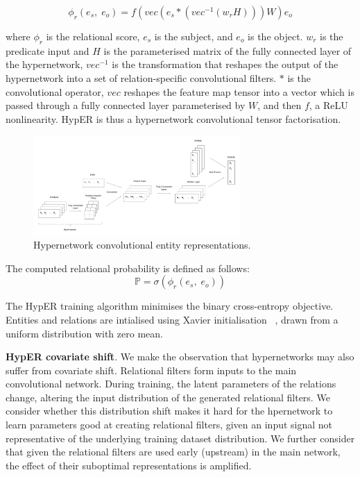 \begin{equation}
	\phi_r(e_s, \; e_o) = f(vec(e_s * (vec^{-1}(w_rH)))W)e_o
\end{equation}

\noindent where $ \phi_r $ is the relational score, $ e_s $ is the subject, and $ e_o $ is the object. $ w_r $ is the predicate input and $ H $ is the parameterised matrix of the fully connected layer of the hypernetwork, $ vec^{-1} $ is the transformation that reshapes the output of the hypernetwork into a set of relation-specific convolutional filters. $ * $ is the convolutional operator, $ vec $ reshapes the feature map tensor into a vector which is passed through a fully connected layer parameterised by $ W $, and then $ f $, a ReLU nonlinearity. HypER is thus a hypernetwork convolutional tensor factorisation. 

\begin{figure}[H]
   	\centering
    	\includegraphics[width=0.7\textwidth, height=0.5\textwidth]{hyper_neural_tensor_network_final}
	\caption{Hypernetwork convolutional entity representations.}
\end{figure}

\noindent The computed relational probability is defined as follows: 
\begin{equation}
	\mathbb{P} = \sigma(\phi_r(e_s, \; e_o)) 
\end{equation}

\noindent The HypER training algorithm minimises the binary cross-entropy objective. Entities and relations are intialised using Xavier initialisation \unskip ~\citep{glorot2010understanding}, drawn from a uniform distribution with zero mean. \par

\noindent \textbf{HypER covariate shift}. We make the observation that hypernetworks may also suffer from covariate shift. Relational filters form inputs to the main convolutional network. During training, the latent parameters of the relations change, altering the input distribution of the generated relational filters. We consider whether this distribution shift makes it hard for the hpernetwork to learn parameters good at creating relational filters, given an input signal not representative of the underlying training dataset distribution. We further consider that given the relational filters are used early (upstream) in the main network, the effect of their suboptimal representations is amplified. \par

